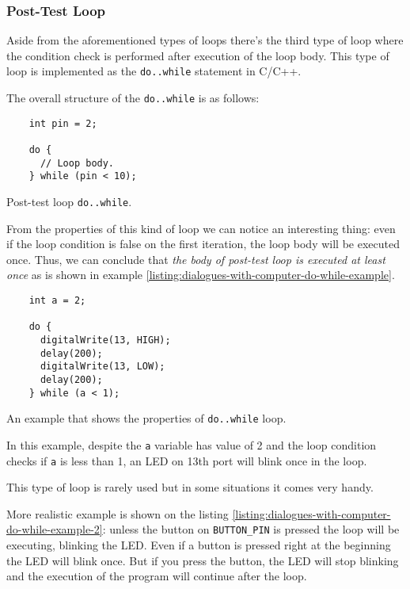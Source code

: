 \documentclass[../sparc.tex]{subfiles}
\begin{document}
\subsubsection{Post-Test Loop}

Aside from the aforementioned types of loops there's the third type of loop
where the condition check is performed after execution of the loop body.  This
type of loop is implemented as the \texttt{do..while} statement in C/C++.

The overall structure of the \texttt{do..while} is as follows:

\begin{listing}[ht]
  \begin{verbatim}
    int pin = 2;

    do {
      // Loop body.
    } while (pin < 10);
  \end{verbatim}
  \label{listing:dialogues-with-computer-do-while}
  \caption{Post-test loop \texttt{do..while}.}
\end{listing}

From the properties of this kind of loop we can notice an interesting thing:
even if the loop condition is false on the first iteration, the loop body will
be executed once.  Thus, we can conclude that \emph{the body of post-test loop
is executed at least once} as is shown in example
\ref{listing:dialogues-with-computer-do-while-example}.

\begin{listing}[ht]
  \begin{verbatim}
    int a = 2;

    do {
      digitalWrite(13, HIGH);
      delay(200);
      digitalWrite(13, LOW);
      delay(200);
    } while (a < 1);
  \end{verbatim}
  \label{listing:dialogues-with-computer-do-while-example}
  \caption{An example that shows the properties of \texttt{do..while} loop.}
\end{listing}

In this example, despite the \texttt{a} variable has value of 2 and the loop
condition checks if \texttt{a} is less than 1, an LED on 13th port will blink
once in the loop.

This type of loop is rarely used but in some situations it comes very handy.

More realistic example is shown on the listing
\ref{listing:dialogues-with-computer-do-while-example-2}: unless the button on
\texttt{BUTTON\_PIN} is pressed the loop will be executing, blinking the LED.
Even if a button is pressed right at the beginning the LED will blink once.  But
if you press the button, the LED will stop blinking and the execution of the
program will continue after the loop.
\end{document}
